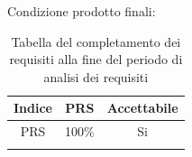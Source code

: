 		Condizione prodotto finali:
		\begin{center}
			\begin{longtable}{|c|c|c|}
			\hline
			\rowcolor{lighter-grayer}
			\textbf{Indice} & \textbf{PRS} & \textbf{Accettabile} \\
			\hline
			\endfirsthead
			\hline
			PRS & 100\% & Si \\
			\hline
			\rowcolor{white}
			\caption{Tabella del completamento dei requisiti alla fine del periodo di analisi dei requisiti}
		\end{longtable}
	\end{center}

